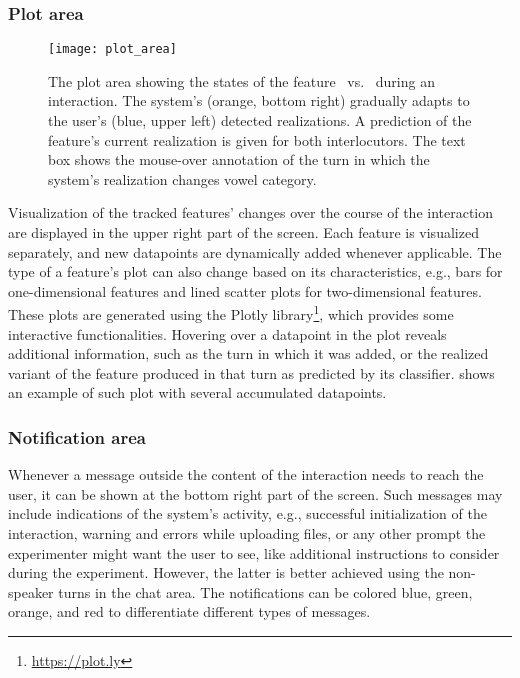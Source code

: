 \subsubsection{Plot area}
\label{subsubsec:plot_area}

\begin{figure}[t]
	\centering
	\texttt{[image: plot\_area]}
	\caption[Real-time dynamic visualization of phonetic changes]
		{The plot area showing the states of the feature \textipa{[E:]}~vs.~\textipa{[e:]} during an interaction.
		The system's (orange, bottom right) gradually adapts to the user's (blue, upper left) detected realizations.
		A prediction of the feature's current realization is given for both interlocutors.
		The text box shows the mouse-over annotation of the turn in which the system's realization changes vowel category.}
	\label{fig:plot}
\end{figure}

Visualization of the tracked features' changes over the course of the interaction are displayed in the upper right part of the screen.
Each feature is visualized separately, and new datapoints are dynamically added whenever applicable.
The type of a feature's plot can also change based on its characteristics, e.g., bars for one-dimensional features and lined scatter plots for two-dimensional features.
These plots are generated using the Plotly library\footnote{\url{https://plot.ly}}, which provides some interactive functionalities.
Hovering over a datapoint in the plot reveals additional information, such as the turn in which it was added, or the realized variant of the feature produced in that turn as predicted by its classifier.
 shows an example of such plot with several accumulated datapoints.

\subsubsection{Notification area}
\label{subsubsec:notification_area}

Whenever a message outside the content of the interaction needs to reach the user, it can be shown at the bottom right part of the screen.
Such messages may include indications of the system's activity, e.g., successful initialization of the interaction, warning and errors while uploading files, or any other prompt the experimenter might want the user to see, like additional instructions to consider during the experiment.
However, the latter is better achieved using the non-speaker turns in the chat area.
The notifications can be colored blue, green, orange, and red to differentiate different types of messages.

